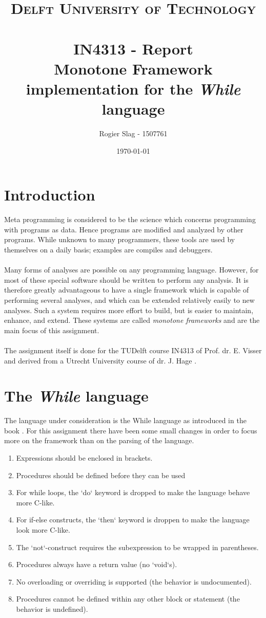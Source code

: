 \documentclass[paper=a4, fontsize=11pt]{scrartcl} %
\title{	
	\normalfont \normalsize 
	\textsc{Delft University of Technology} \\ [25pt] %
	\horrule{0.5pt} \\[0.4cm] %
	\huge IN4313 - Report\\ %
	\small{Monotone Framework implementation for the \textit{While} language}
	\horrule{2pt} \\[0.1cm] %
}
\author{Rogier Slag - 1507761} %
\date{\normalsize\today} %
\numberwithin{equation}{section} %
\numberwithin{figure}{section} %
\numberwithin{table}{section} %
\begin{document}
\maketitle %

\section{Introduction}

Meta programming is considered to be the science which concerns programming with programs as data. 
Hence programs are modified and analyzed by other programs.
While unknown to many programmers, these tools are used by themselves on a daily basis;
examples are compiles and debuggers.
\\
\\
Many forms of analyses are possible on any programming language.
However, for most of these special software should be written to perform any analysis.
It is therefore greatly advantageous to have a single framework which is capable of performing several analyses, 
and which can be extended relatively easily to new analyses.
Such a system requires more effort to build, but is easier to maintain, enhance, and extend.
These systems are called \textit{monotone frameworks} and are the main focus of this assignment.
\\
\\
The assignment itself is done for the TUDelft course IN4313 of Prof. dr. E. Visser \cite{studyguide} and derived from a Utrecht University course of dr. J. Hage \cite{csuunl}.

\section{The \textit{While} language}
\label{sec:language}

The language under consideration is the While language as introduced in the book \cite{nielson1999principles}.
For this assignment there have been some small changes in order to focus more on the framework than on the parsing of the language.

\begin{enumerate}
\item Expressions should be enclosed in brackets.
\item Procedures should be defined before they can be used
\item For while loops, the `do` keyword is dropped to make the language behave more C-like.
\item For if-else constructs, the `then` keyword is droppen to make the language look more C-like.
\item The `not`-construct requires the subexpression to be wrapped in parentheses.
\item Procedures always have a return value (no `void`s).
\item No overloading or overriding is supported (the behavior is undocumented).
\item Procedures cannot be defined within any other block or statement (the behavior is undefined).
\end{enumerate}
\end{document}
